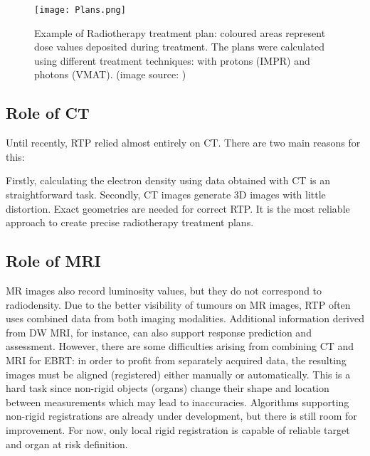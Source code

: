 \begin{figure}[!tbh]
	\centering
	\texttt{[image: Plans.png]}
	\caption{Example of Radiotherapy treatment plan: coloured areas represent dose values deposited during treatment. The plans were calculated using different treatment techniques: with protons (IMPR) and photons (VMAT). (image source: \cite{Andrzejewski2015})}
	\label{fig:plan}
\end{figure}


\clearpage



\subsection{Role of CT}

Until recently, RTP relied almost entirely on CT.
There are two main reasons for this:

Firstly, calculating the electron density using data obtained with CT is an straightforward task.
Secondly, CT images generate 3D images with little distortion. Exact geometries are needed for correct RTP.
It is the most reliable approach to create precise radiotherapy treatment plans. \cite{Constantinou2012, Schneider1996}

\subsection{Role of MRI}
MR images also record luminosity values, but they do not correspond to radiodensity.
Due to the better visibility of tumours on MR images, RTP often uses combined data from both imaging modalities.
Additional information derived from DW MRI, for instance, can also support response prediction and assessment.
However, there are some difficulties arising from combining CT and MRI for EBRT:
in order to profit from separately acquired data, the resulting images must be aligned (registered) either manually or automatically.
This is a hard task since non-rigid objects (organs) change their shape and location between measurements which may lead to inaccuracies.
Algorithms supporting non-rigid registrations are already under development, but there is still room for improvement.
For now, only local rigid registration is capable of reliable target and organ at risk definition.

